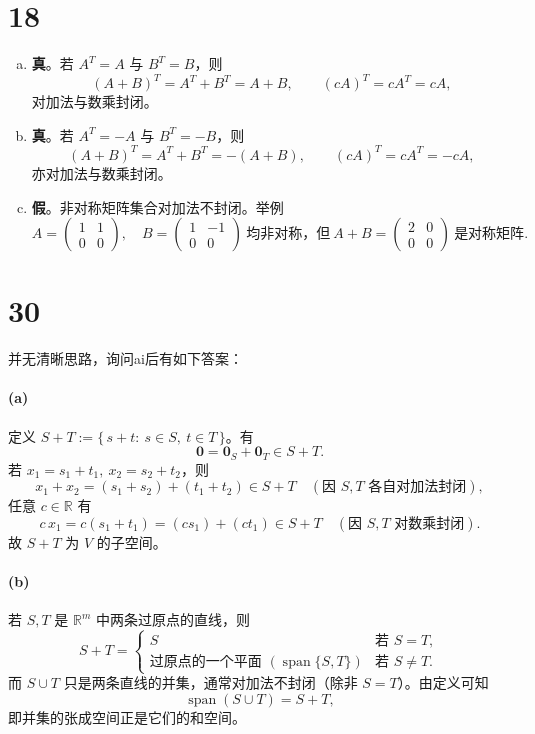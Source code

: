 \documentclass[12pt]{ctexart}
\DeclareMathOperator{\Span}{span}
\begin{document}
\section*{18}
\begin{enumerate}[(a)]
  \item \textbf{真}。若 $A^T=A$ 与 $B^T=B$，则
  \[
  (A+B)^T=A^T+B^T=A+B,\qquad (cA)^T=cA^T=cA,
  \]
  对加法与数乘封闭。
  \item \textbf{真}。若 $A^T=-A$ 与 $B^T=-B$，则
  \[
  (A+B)^T=A^T+B^T=-(A+B),\qquad (cA)^T=cA^T=-cA,
  \]
  亦对加法与数乘封闭。
  \item \textbf{假}。非对称矩阵集合对加法不封闭。举例
  \[
  A=\begin{pmatrix}1&1\\0&0\end{pmatrix},\quad
  B=\begin{pmatrix}1&-1\\0&0\end{pmatrix}\ \text{均非对称，但}\ 
  A+B=\begin{pmatrix}2&0\\0&0\end{pmatrix}\ \text{是对称矩阵}.
  \]
\end{enumerate}

\section*{30}
并无清晰思路，询问ai后有如下答案：
\paragraph{(a)} 定义 $S+T:=\{\,s+t:\ s\in S,\ t\in T\,\}$。有
\[
\mathbf{0}=\mathbf{0}_S+\mathbf{0}_T\in S+T.
\]
若 $x_1=s_1+t_1,\ x_2=s_2+t_2$，则
\[
x_1+x_2=(s_1+s_2)+(t_1+t_2)\in S+T\quad(\text{因 }S,T\text{ 各自对加法封闭}),
\]
任意 $c\in\mathbb{R}$ 有
\[
c\,x_1=c(s_1+t_1)=(cs_1)+(ct_1)\in S+T\quad(\text{因 }S,T\text{ 对数乘封闭}).
\]
故 $S+T$ 为 $V$ 的子空间。

\paragraph{(b)} 若 $S,T$ 是 $\mathbb{R}^m$ 中两条过原点的直线，则
\[
S+T=\begin{cases}
S & \text{若 }S=T,\\[2pt]
\text{过原点的一个平面 }(\Span\{S,T\}) & \text{若 }S\ne T.
\end{cases}
\]
而 $S\cup T$ 只是两条直线的并集，通常对加法不封闭（除非 $S=T$）。由定义可知
\[
\Span(S\cup T)=S+T,
\]
即并集的张成空间正是它们的和空间。
\end{document}
